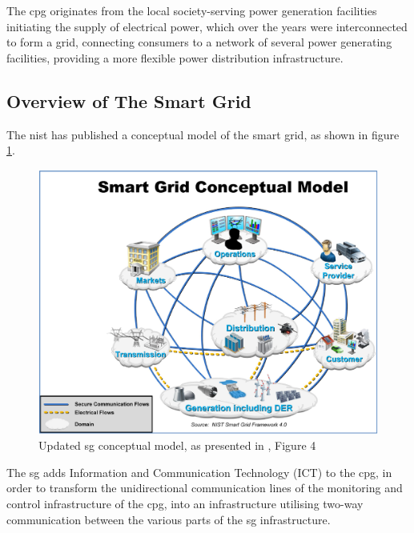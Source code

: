 The \acrlong{cpg} originates from the local society-serving power generation facilities initiating the supply of electrical power, which over the years were interconnected to form a grid, connecting consumers to a network of several power generating facilities, providing a more flexible power distribution infrastructure. 


\subsection{Overview of The Smart Grid}


The \acrfull{nist} has published a conceptual model of the smart grid, as shown in 
figure \ref{fig:NIST-SmartGRID-ConceptualModel}.



\begin{figure}[ht]
\includegraphics[width=\linewidth]{figures/NIST-SmartGRID-ConceptualModel.png}
\caption[Smart Grid Conceptual Model]{Updated \acrlong{sg} conceptual model, as presented in \cite[p. 13]{gopstein2021nist}, Figure 4}
\label{fig:NIST-SmartGRID-ConceptualModel}
\end{figure}






The \acrlong{sg} adds Information and Communication Technology (ICT) to the \acrlong{cpg}, in order to transform the  unidirectional communication lines of the monitoring and control infrastructure of the \acrlong{cpg}, into an infrastructure utilising two-way communication between the various parts of the \acrlong{sg} infrastructure. 






